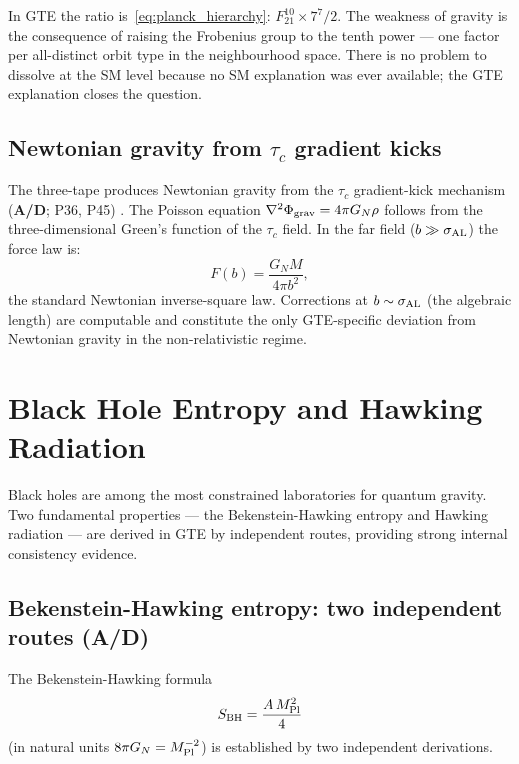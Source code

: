\documentclass[11pt,openany]{book}
\theoremstyle{remark}
\newcommand{\MPl}{M_{\rm Pl}}
\newcommand{\GN}{G_N}
\newcommand{\CMCA}{\text{CMCA}}
\newcommand{\CatAD}{\textbf{A/D}}
\begin{document}
In GTE the ratio is~\eqref{eq:planck_hierarchy}: $F_{21}^{10} \times 7^7 / 2$.
The weakness of gravity is the consequence of raising the Frobenius group to the tenth
power --- one factor per all-distinct orbit type in the \CMCA{} neighbourhood space.
There is no problem to dissolve at the SM level because no SM explanation was ever
available; the GTE explanation closes the question.

\subsection*{Newtonian gravity from $\tau_c$ gradient kicks}

The three-tape \CMCA{} produces Newtonian gravity from the $\tau_c$ gradient-kick
mechanism (\CatAD; P36, P45) \cite{SpivackEmergentGravity}.
The Poisson equation
$\nabla^2\Phi_{\rm grav} = 4\pi\GN\rho$
follows from the three-dimensional Green's function of the $\tau_c$ field.
In the far field ($b \gg \sigma_{\rm AL}$) the force law is:
\begin{equation}
  F(b) = \frac{\GN M}{4\pi b^2},
  \label{eq:newton_law}
\end{equation}
the standard Newtonian inverse-square law.
Corrections at $b \sim \sigma_{\rm AL}$ (the algebraic length) are computable
and constitute the only GTE-specific deviation from Newtonian gravity in the
non-relativistic regime.

\section{Black Hole Entropy and Hawking Radiation}
\label{sec:bh}

Black holes are among the most constrained laboratories for quantum gravity.
Two fundamental properties --- the Bekenstein-Hawking entropy and Hawking radiation ---
are derived in GTE by independent routes, providing strong internal consistency
evidence.

\subsection*{Bekenstein-Hawking entropy: two independent routes (\CatAD)}

The Bekenstein-Hawking formula
\begin{equation}
  S_{\rm BH} = \frac{A\,\MPl^2}{4}
  \label{eq:SBH}
\end{equation}
(in natural units $8\pi\GN = \MPl^{-2}$)
is established by two independent derivations.
\end{document}
